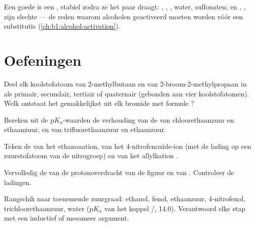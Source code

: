 Een goede  is een , stabiel zodra ze het
paar draagt: , , , water, sulfonaten;  en
, , zijn slechte  --- de reden
waarom alcoholen geactiveerd moeten worden vóór een substitutie
(\cref{ch:b1:alcohol-activation}).

\section{Oefeningen}

\begin{exercise}[$\star$]\label{exo:b1:electronic-effects:1}
Deel elk koolstofatoom van 2-methylbutaan en van
2-broom-2-methylpropaan in als primair, secundair, tertiair of quaternair
(gebonden aan vier koolstofatomen). Welk  ontstaat het
gemakkelijkst uit elk bromide met formule ?
\end{exercise}

\begin{exercise}[$\star$]\label{exo:b1:electronic-effects:2}
Bereken uit de $\mathrm{p}K_a$-waarden de verhouding van de 
van chloorethaanzuur en ethaanzuur, en van trifluorethaanzuur en
ethaanzuur.
\end{exercise}

\begin{exercise}[$\star$]\label{exo:b1:electronic-effects:3}
Teken de  van het ethanoaation, van het
4-nitrofenoxide-ion (met de lading op een zuurstofatoom van de
nitrogroep) en van het allylkation .
\end{exercise}

\begin{exercise}[$\star$]\label{exo:b1:electronic-effects:4}
Vervolledig de  van de protonoverdracht van de figuur en
van . Controleer de ladingen.
\end{exercise}

\begin{exercise}[$\star\star$]\label{exo:b1:electronic-effects:5}
Rangschik naar toenemende zuurgraad: ethanol, fenol, ethaanzuur,
4-nitrofenol, trichloorethaanzuur, water ($\mathrm{p}K_a$ van het koppel
/, 14.0). Verantwoord elke stap met een inductief of
mesomeer argument.
\end{exercise}

